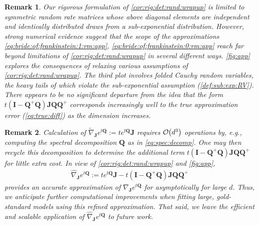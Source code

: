 \documentclass[9pt,twocolumn,twoside]{pnas-new}
\makeatletter
\newcommand{\order}[1]{{\cal O}\hspace{-0.2em}\left( #1 \right)}
\newcommand{\?}{\textbf{?}}
\newcommand{\QQ}{\mathbf{Q}}
\newcommand{\JJ}{\mathbf{J}}
\newcommand{\II}{\mathbf{I}}
\newtheorem{@remark}{\bf Remark}
\newenvironment{remark}{\begin{@remark}\rm}{\end{@remark}}
\makeatother
\begin{document}
\begin{remark}\label{rmk:non:sym:num:ev}
  Our rigorous formulation of \cref{cor:rig:det:rand:wrapup} is
  limited to symmetric random rate matrices whose above diagonal
  elements are independent and identically distributed draws from a
  sub-exponential distribution. However, strong numerical evidence
  suggest that the scope of the approximations
  \eqref{eq:bride:of:frankinstein:1:rm:app},
  \eqref{eq:bride:of:frankinstein:0:rm:app} reach far beyond
  limitations of \cref{cor:rig:det:rand:wrapup} in several different
  ways. \cref{fig:app} explores the
  consequences of relaxing various assumptions of
  \cref{cor:rig:det:rand:wrapup}.  The third plot involves folded Cauchy random variables, the heavy tails of which violate the sub-exponential assumption (\cref{def:sub:exp:RV}).  There appears to be no
  significant departure from the idea that the form
  $t(\II -\QQ^+ \QQ) \JJ \QQ \QQ^{+}$ corresponds increasingly well to
  the true approximation error (\eqref{eq:true:diff}) as the dimension
  increases.
\end{remark}

\begin{remark}\label{rmk:better:approx}
  Calculation of
  $\widetilde{\nabla}_{\JJ} e^{t\QQ} := t e^{t\QQ} \JJ$ requires
  $\order{d^3}$ operations by, e.g., computing the spectral
  decomposition $\QQ$ as in \eqref{eq:spec:decomp}.  One may then recycle this
  decomposition to determine the
  additional term $t(\II -\QQ^+ \QQ) \JJ \QQ \QQ^{+}$ for little extra cost.  In view of
  \cref{cor:rig:det:rand:wrapup} and \cref{fig:app},
  \begin{align}\label{eq:better:help:on:sale}
    \widehat{\nabla}_{\JJ} e^{t\QQ} := t e^{t\QQ} \JJ
    -t(\II -\QQ^+ \QQ) \JJ \QQ \QQ^{+}
  \end{align}
  provides an accurate approximation of $\nabla_{\JJ} e^{t\QQ}$ for
  asymptotically for large $d$. Thus, we anticipate further computational improvements when fitting
  large, gold-standard models using this
  refined approximation.  That said, we leave the efficient and scalable application of $\widehat{\nabla}_{\JJ} e^{t\QQ}$ to future work.
\end{remark}
\end{document}
